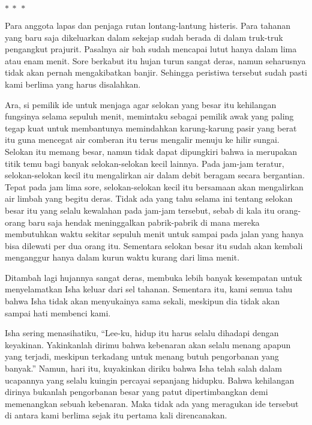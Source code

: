 \documentclass[smalldemyvopaper,11pt,twoside,onecolumn,openright,extrafontsizes]{memoir}
\newcommand\separator{
  \begin{center}
    \(\ast~\ast~\ast\)
  \end{center}
}
\begin{document}
\separator{}


Para anggota lapas dan penjaga rutan lontang-lantung histeris. Para tahanan yang baru saja dikeluarkan dalam sekejap sudah berada di dalam truk-truk pengangkut prajurit. Pasalnya air bah sudah mencapai lutut hanya dalam lima atau enam menit. Sore berkabut itu hujan turun sangat deras, namun seharusnya tidak akan pernah mengakibatkan banjir. Sehingga peristiwa tersebut sudah pasti kami berlima yang harus disalahkan.


Ara, si pemilik ide untuk menjaga agar selokan yang besar itu kehilangan fungsinya selama sepuluh menit, memintaku sebagai pemilik awak yang paling tegap kuat untuk membantunya memindahkan karung-karung pasir yang berat itu guna mencegat air comberan itu terus mengalir menuju ke hilir sungai. Selokan itu memang besar, namun tidak dapat dipungkiri bahwa ia merupakan titik temu bagi banyak selokan-selokan kecil lainnya. Pada jam-jam teratur, selokan-selokan kecil itu mengalirkan air dalam debit beragam secara bergantian. Tepat pada jam lima sore, selokan-selokan kecil itu bersamaan akan mengalirkan air limbah yang begitu deras. Tidak ada yang tahu selama ini tentang selokan besar itu yang selalu kewalahan pada jam-jam tersebut, sebab di kala itu orang-orang baru saja hendak meninggalkan pabrik-pabrik di mana mereka membutuhkan waktu sekitar sepuluh menit untuk sampai pada jalan yang hanya bisa dilewati per dua orang itu. Sementara selokan besar itu sudah akan kembali menganggur hanya dalam kurun waktu kurang dari lima menit.

Ditambah lagi hujannya sangat deras, membuka lebih banyak kesempatan untuk menyelamatkan Isha keluar dari sel tahanan. Sementara itu, kami semua tahu bahwa Isha tidak akan menyukainya sama sekali, meskipun dia tidak akan sampai hati membenci kami.


Isha sering menasihatiku, ``Lee-ku, hidup itu harus selalu dihadapi dengan keyakinan. Yakinkanlah dirimu bahwa kebenaran akan selalu menang apapun yang terjadi, meskipun terkadang untuk menang butuh pengorbanan yang banyak.'' Namun, hari itu, kuyakinkan diriku bahwa Isha telah salah dalam ucapannya yang selalu kuingin percayai sepanjang hidupku. Bahwa kehilangan dirinya bukanlah pengorbanan besar yang patut dipertimbangkan demi memenangkan sebuah kebenaran. Maka tidak ada yang meragukan ide tersebut di antara kami berlima sejak itu pertama kali direncanakan.
\end{document}
